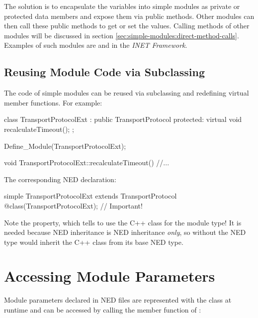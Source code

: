 The solution is to encapsulate the variables into simple modules
as private or protected data members and expose them via public methods.
Other modules can then call these public methods to get or set the values.
Calling methods of other modules will be discussed in section
\ref{sec:simple-modules:direct-method-calls}.
Examples of such modules are  and 
in the \textit{INET Framework}.


\subsection{Reusing Module Code via Subclassing}
\label{sec:simple-modules:module-subclassing}

The code of simple modules can be reused via subclassing and redefining
virtual member functions. For example:

\begin{cpp}
class TransportProtocolExt : public TransportProtocol
{
  protected:
    virtual void recalculateTimeout();
};

Define_Module(TransportProtocolExt);

void TransportProtocolExt::recalculateTimeout()
{
    //...
}
\end{cpp}

The corresponding NED declaration:

\begin{ned}
simple TransportProtocolExt extends TransportProtocol
{
    @class(TransportProtocolExt);  // Important!
}
\end{ned}

\begin{note}
  Note the  property, which tells {\opp} to use the
   C++ class for the module type! It is needed
  because NED inheritance is NED inheritance \textit{only}, so without 
  the  NED type would inherit the C++ class from
  its base NED type.
\end{note}



\section{Accessing Module Parameters}
\label{sec:simple-modules:parameters}

Module parameters declared in NED files are represented with the 
class at runtime and can be accessed by
calling the  member function of :

